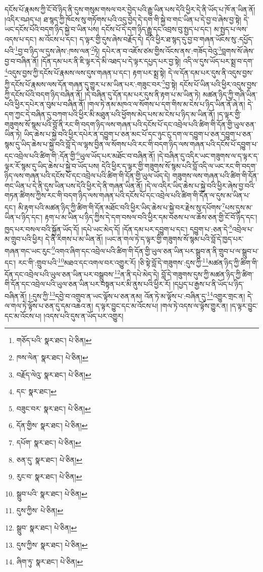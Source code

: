 དངོས་པོ་རྣམས་ཀྱི་ངོ་བོ་ཉིད་ནི་དུས་གསུམ་གསལ་བར་བྱེད་པའི་རྒྱུ་ཡིན་པས་དེའི་ཕྱིར་དེ་ནི་ཡོད་པ་ཁོ་ན་ཡིན་ནོ། །འདིར་བཤད་པ། ཐ་སྙད་ཀྱི་ཁོངས་སུ་གཏོགས་པའི་འདུ་བྱེད་དེ་དག་གི་སྐྱེ་བ་གང་ཡིན་པ་དེ་བྱ་བ་ཞེས་བྱ་སྟེ། དེ་ཡང་དངོས་པོའི་བདག་ཉིད་སྐྱེ་བ་ཡིན་པས། དངོས་པོ་དེ་དག་ཉིད་རྒྱུ་དང་འབྲས་བུ་སྤྱད་པ་དང་། མ་སྤྱད་པ་ལས་འདས་པ་དང་། མ་འོངས་པ་དང་། ད་ལྟར་གྱི་དུས་ཞེས་བརྗོད་དེ། དེའི་ཕྱིར་ཐ་སྙད་དུ་བྱ་བ་གཞན་ཡོངས་སུ་:དཔྱོད་པའི་\footnote{གཅོད་པའི་  སྣར་ཐང་།  པེ་ཅིན། }བྱ་བ་ཉིད་ལ་དུས་ཞེས་:ཁས་ལན་\footnote{ཁས་ལེན་  སྣར་ཐང་།  པེ་ཅིན། }ཏེ། དཔེར་ན་བ་འཇོས་ཙམ་གྱིས་འོངས་ནས་:གཟོད་བེའུ་\footnote{བརྗོད་ལེའུ་  སྣར་ཐང་།  པེ་ཅིན། }བླགས་སོ་ཞེས་བྱ་བ་བཞིན་ནོ། །དོན་དམ་པར་ནི་ཇི་ལྟར་དེ་མི་འཐད་པ་དེ་ལྟར་དཔྱད་པར་བྱ་སྟེ། འདི་ལ་དུས་ཡོད་པར་སྨྲ་བ་དག་\footnote{དང་  སྣར་ཐང་། }འདུས་བྱས་ཀྱི་དངོས་པོ་རྣམས་ལས་དུས་གཞན་པ་དང་། རྟག་པར་སྨྲ་སྟེ། དེ་ལ་དོན་དམ་པར་དུས་ནི་འདུས་བྱས་ཀྱི་དངོས་པོ་རྣམས་ལས་དོན་གཞན་དུ་གྱུར་པ་མ་ཡིན་པར་:གཟུང་བར་\footnote{བཟུང་བར་  སྣར་ཐང་།  པེ་ཅིན། }བྱ་སྟེ། དངོས་པོ་ཡིན་པའི་ཕྱིར་འདུས་བྱས་ཀྱི་དངོས་པོའི་བདག་ཉིད་བཞིན་ནོ། །དེ་བཞིན་དུ་དོན་དམ་པར་དུས་ནི་རྟག་པ་མ་ཡིན་ཏེ། མཚན་ཉིད་ཀྱི་གཞི་ཡིན་པའི་ཕྱིར་དཔེར་ན་བུམ་པ་བཞིན་ནོ། །གལ་ཏེ་ནམ་མཁའ་ལ་སོགས་པ་དག་གིས་མ་ངེས་པ་ཉིད་ཡིན་ནོ་ཞེ་ན། དེ་དག་ཀྱང་དེ་བཞིན་དུ་བཀག་པའི་ཕྱིར་མི་མཐུན་པའི་ཕྱོགས་མེད་པས་མ་ངེས་པ་ཉིད་མ་ཡིན་ནོ། །ད་ལྟར་གྱི་གཟུགས་སོ་སྙམ་པའི་བློ་ནི་རང་གི་བདག་ཉིད་ལས་གཞན་པའི་དངོས་པོ་དང་འབྲེལ་པའི་ཚིག་གི་དོན་གྱི་ཡུལ་ཅན་ཡིན་ཏེ། ཡིད་ཆེས་པ་སྐྱེ་བའི་ཕྱིར་དཔེར་ན་དབྱུག་པ་ཅན་མང་པོ་དང་ཉུང་ངུ་དག་ལ་དབྱུག་པ་ཅན་དབྱུག་པ་ཅན་སྙམ་དུ་ཡིད་ཆེས་པ་སྐྱེ་བའི་བློ་དེ་ལ་ལྷས་བྱིན་ལ་སོགས་པའི་རང་གི་བདག་ཉིད་ལས་གཞན་པའི་དངོས་པོ་དབྱུག་པ་དང་འབྲེལ་པའི་ཚིག་གི་:དོན་གྱི་\footnote{དོན་གྱིས་  སྣར་ཐང་།  པེ་ཅིན། }ཡུལ་ཡོད་པར་མཐོང་བ་བཞིན་ནོ། །དེ་བཞིན་དུ་འདིར་ཡང་གཟུགས་ལ་ད་ལྟར་ད་ལྟར་རོ་སྙམ་དུ་ཡིད་ཆེས་པ་སྐྱེ་བ་ཡོད་པས། དེའི་ཕྱིར་ད་ལྟར་གྱི་གཟུགས་སོ་སྙམ་པའི་བློ་འདི་ལ་ཡང་རང་གི་བདག་ཉིད་ལས་གཞན་པའི་དངོས་པོ་དང་འབྲེལ་པའི་ཚིག་གི་དོན་གྱི་ཡུལ་ཡོད་དེ། གཟུགས་ལས་གཞན་པའི་ཚིག་གི་དོན་གང་ཡིན་པ་དེ་ནི་དུས་ཡིན་པས་དེའི་ཕྱིར་དེ་ནི་གཞན་ཡིན་ནོ། །དེ་ལ་འདིར་ཡིད་ཆེས་པ་སྐྱེ་བའི་ཕྱིར་ཞེས་བྱ་བའི་གཏན་ཚིགས་ཀྱིས་རང་གི་བདག་ཉིད་ལས་གཞན་པའི་དངོས་པོ་དང་འབྲེལ་པའི་ཚིག་གི་དོན་ལ་དུས་མ་ཡིན་པ་དང་། མི་རྟག་པའི་མཚན་ཉིད་ཀྱི་ཚིག་གི་དོན་མཐོང་བའི་ཕྱིར་ཡིད་ཆེས་པ་སྐྱེ་བར་རྗེས་སུ་དཔོགས་\footnote{དཔོག་  སྣར་ཐང་།  པེ་ཅིན། }པས་དུས་མ་ཡིན་པ་ཉིད་དང་། རྟག་པ་མ་ཡིན་པ་ཉིད་ཀྱིས་དེ་དག་བསལ་བའི་ཕྱིར་དམ་བཅས་པ་ལ་ཆོས་ཅན་གྱི་ངོ་བོ་ཉིད་དང་། ཁྱད་པར་བསལ་བའི་སྐྱོན་ཡོད་དོ། །དཔེ་ཡང་མེད་དོ། །དོན་དམ་པར་དབྱུག་པ་དང་། དབྱུག་པ་:ཅན་དེ་\footnote{ཅན་དུ་  སྣར་ཐང་།  པེ་ཅིན། }འབྲེལ་པ་མ་གྲུབ་པའི་ཕྱིར། དེ་ནི་རིགས་པ་མ་ཡིན་ནོ། །ཡང་ན་གལ་ཏེ་ད་ལྟར་གྱི་གཟུགས་སོ་སྙམ་པའི་བློ་དེ་ཁྱད་པར་གཞན་གང་ཡང་རུང་\footnote{རུང་བ་  སྣར་ཐང་།  པེ་ཅིན། }འགའ་ཞིག་དང་འབྲེལ་པའི་ཚིག་གི་དོན་གྱི་ཡུལ་ཅན་ཡིན་པར་སྒྲུབ་ན་ནི་གྲུབ་པ་ལ་སྒྲུབ་པ་དང་། རང་གི་:གྲུབ་པའི་\footnote{སྒྲུབ་པའི་  སྣར་ཐང་།  པེ་ཅིན། }མཐའ་དང་འགལ་བར་འགྱུར་རོ། །ཅི་སྟེ་བློ་དེ་གཟུགས་:དུས་ཀྱི་\footnote{དུས་ཀྱིས་  པེ་ཅིན། }མཚན་ཉིད་ཀྱི་ཚིག་གི་དོན་དང་འབྲེལ་པའི་ཡུལ་ཅན་ཡིན་པར་བསྒྲུབས་\footnote{སྒྲུབ་  སྣར་ཐང་།  པེ་ཅིན། }ན་ནི་དཔེ་མེད་དེ། བློ་དེ་གཟུགས་དུས་ཀྱི་མཚན་ཉིད་ཀྱི་ཚིག་གི་དོན་དང་འབྲེལ་པའི་ཡུལ་ཅན་ཡིན་པར་བསྟན་པར་མི་ནུས་པའི་ཕྱིར་རོ། །དཔྱད་པ་རྒྱས་པ་ནི་ཡོད་པ་ཉིད་བཞིན་ནོ། །:དུས་ཀྱི་\footnote{དུས་ཀྱིས་  སྣར་ཐང་།  པེ་ཅིན། }དབྱེ་བ་འགྲུབ་ན་ཡང་ལྟོས་པ་ཅན་ནམ། འོན་ཏེ་མ་ལྟོས་པ་:བཞིན་དུ་\footnote{ཞིག་ཏུ་  སྣར་ཐང་།  པེ་ཅིན། }འགྱུར་གྲང་ན། དེ་ལ་གལ་ཏེ་ལྟོས་པ་ཅན་དུ་དམ་འཆའ་ན། ད་ལྟར་བྱུང་དང་མ་འོངས་པ། །གལ་ཏེ་འདས་ལ་ལྟོས་གྱུར་ན། །ད་ལྟར་བྱུང་དང་མ་འོངས་པ། །འདས་པའི་དུས་ན་ཡོད་པར་འགྱུར། 